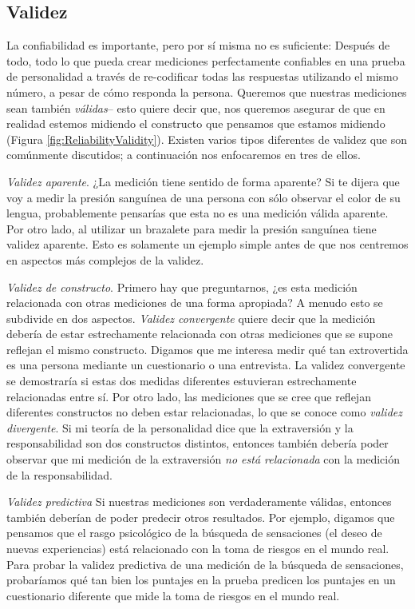 \documentclass[
  12pt,
]{book}
\begin{document}
\hypertarget{validez}{%
\subsection{Validez}\label{validez}}

La confiabilidad es importante, pero por sí misma no es suficiente: Después de todo, todo lo que pueda crear mediciones perfectamente confiables en una prueba de personalidad a través de re-codificar todas las respuestas utilizando el mismo número, a pesar de cómo responda la persona. Queremos que nuestras mediciones sean también \emph{válidas}-- esto quiere decir que, nos queremos asegurar de que en realidad estemos midiendo el constructo que pensamos que estamos midiendo (Figura \ref{fig:ReliabilityValidity}). Existen varios tipos diferentes de validez que son comúnmente discutidos; a continuación nos enfocaremos en tres de ellos.

\emph{Validez aparente}. ¿La medición tiene sentido de forma aparente? Si te dijera que voy a medir la presión sanguínea de una persona con sólo observar el color de su lengua, probablemente pensarías que esta no es una medición válida aparente. Por otro lado, al utilizar un brazalete para medir la presión sanguínea tiene validez aparente. Esto es solamente un ejemplo simple antes de que nos centremos en aspectos más complejos de la validez.

\emph{Validez de constructo}. Primero hay que preguntarnos, ¿es esta medición relacionada con otras mediciones de una forma apropiada? A menudo esto se subdivide en dos aspectos. \emph{Validez convergente} quiere decir que la medición debería de estar estrechamente relacionada con otras mediciones que se supone reflejan el mismo constructo. Digamos que me interesa medir qué tan extrovertida es una persona mediante un cuestionario o una entrevista. La validez convergente se demostraría si estas dos medidas diferentes estuvieran estrechamente relacionadas entre sí. Por otro lado, las mediciones que se cree que reflejan diferentes constructos no deben estar relacionadas, lo que se conoce como \emph{validez divergente}. Si mi teoría de la personalidad dice que la extraversión y la responsabilidad son dos constructos distintos, entonces también debería poder observar que mi medición de la extraversión \emph{no está relacionada} con la medición de la responsabilidad.

\emph{Validez predictiva} Si nuestras mediciones son verdaderamente válidas, entonces también deberían de poder predecir otros resultados. Por ejemplo, digamos que pensamos que el rasgo psicológico de la búsqueda de sensaciones (el deseo de nuevas experiencias) está relacionado con la toma de riesgos en el mundo real. Para probar la validez predictiva de una medición de la búsqueda de sensaciones, probaríamos qué tan bien los puntajes en la prueba predicen los puntajes en un cuestionario diferente que mide la toma de riesgos en el mundo real.
\end{document}
